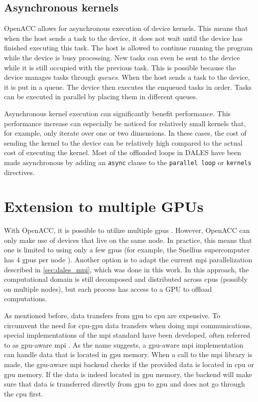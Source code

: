 \subsection{Asynchronous kernels}
OpenACC allows for asynchronous execution of device kernels. This means that when the host sends a task to the device, it does not wait until the device has finished executing this task. The host is allowed to continue running the program while the device is busy processing. New tasks can even be sent to the device while it is still occupied with the previous task. This is possible because the device manages tasks through \emph{queues}. When the host sends a task to the device, it is put in a queue. The device then executes the enqueued tasks in order. Tasks can be executed in parallel by placing them in different queues.

Asynchronous kernel execution can significantly benefit performance. This performance increase can especially be noticed for relatively small kernels that, for example, only iterate over one or two dimensions. In these cases, the cost of sending the kernel to the device can be relatively high compared to the actual cost of executing the kernel. Most of the offloaded loops in DALES have been made asynchronous by adding an \texttt{async} clause to the \texttt{parallel loop} or \texttt{kernels} directives. 

\section{Extension to multiple GPUs}
With OpenACC, it is possible to utilize multiple \acrshort{gpu}s \citep{farberParallelProgrammingOpenACC2017}. However, OpenACC can only make use of devices that live on the same node. In practice, this means that one is limited to using only a few \acrshort{gpu}s (for example, the Snellius supercomputer has 4 \acrshort{gpu}s per node \citep{surfSnelliusHardwareFile}). Another option is to adapt the current \acrshort{mpi} parallelization described in \autoref{sec:dales_mpi}, which was done in this work. In this approach, the computational domain is still decomposed and distributed across \acrshort{cpu}s (possibly on multiple nodes), but each process has access to a GPU to offload computations. 

As mentioned before, data transfers from \acrshort{gpu} to \acrshort{cpu} are expensive. To circumvent the need for \acrshort{cpu}-\acrshort{gpu} data transfers when doing \acrshort{mpi} communications, special implementations of the \acrshort{mpi} standard have been developed, often referred to as \acrshort{gpu}-aware \acrshort{mpi} \citep{potluriEfficientInternodeMPI2013}. As the name suggests, a \acrshort{gpu}-aware \acrshort{mpi} implementation can handle data that is located in \acrshort{gpu} memory. When a call to the \acrshort{mpi} library is made, the \acrshort{gpu}-aware \acrshort{mpi} backend checks if the provided data is located in \acrshort{cpu} or \acrshort{gpu} memory. If the data is indeed located in \acrshort{gpu} memory, the backend will make sure that data is transferred directly from \acrshort{gpu} to \acrshort{gpu} and does not go through the \acrshort{cpu} first. 

